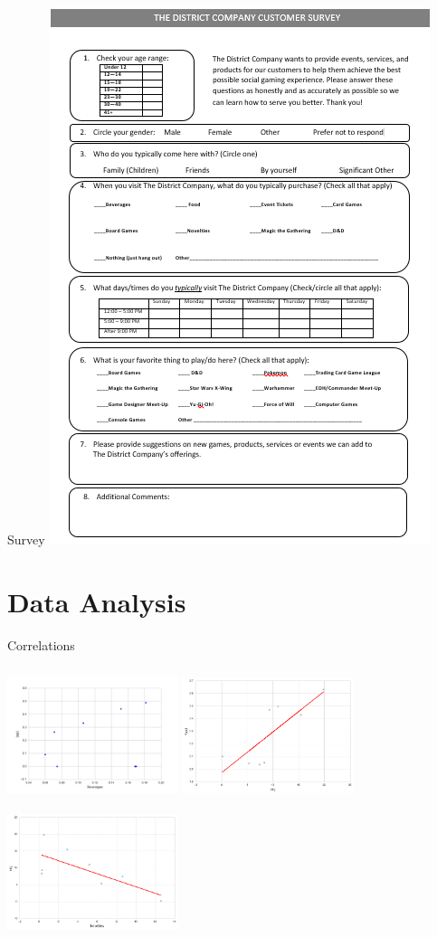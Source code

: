 \documentclass[compress,blue]{beamer}
\begin{document}
\begin{frame}{Survey}
\vspace{-.6cm}\hspace{9.5cm}\includegraphics[width=.6\textwidth]{DistrictSurvey}
\end{frame}

\section{Data Analysis}


\begin{frame}{Correlations}
\begin{rows}
\row{\textwidth}
\centering
\includegraphics[width=5cm,height=4cm]{DandD_Beverages}
\includegraphics[width=5cm,height=4cm]{mtg_food}
\row{\textwidth}
\centering
\hspace*{2.5cm}
\includegraphics[width=5cm,height=3.75cm]{mtg_novelties}
\end{rows}
\end{frame}
\end{document}
